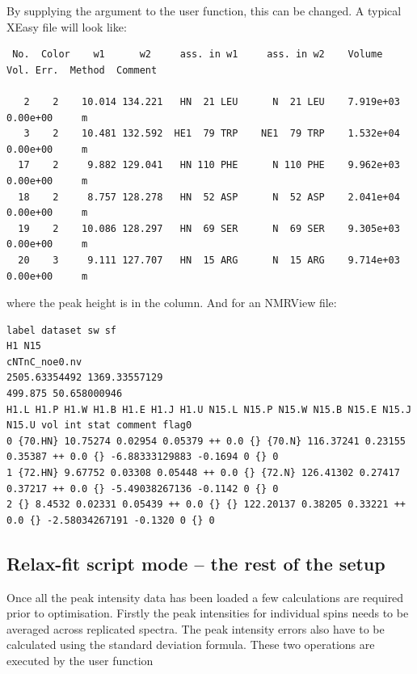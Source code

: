 By supplying the  argument to the  user function, this can be changed.
A typical XEasy file will look like:

{\scriptsize \begin{verbatim}
 No.  Color    w1      w2     ass. in w1     ass. in w2    Volume     Vol. Err.  Method  Comment

   2    2    10.014 134.221   HN  21 LEU      N  21 LEU    7.919e+03  0.00e+00     m
   3    2    10.481 132.592  HE1  79 TRP    NE1  79 TRP    1.532e+04  0.00e+00     m
  17    2     9.882 129.041   HN 110 PHE      N 110 PHE    9.962e+03  0.00e+00     m
  18    2     8.757 128.278   HN  52 ASP      N  52 ASP    2.041e+04  0.00e+00     m
  19    2    10.086 128.297   HN  69 SER      N  69 SER    9.305e+03  0.00e+00     m
  20    3     9.111 127.707   HN  15 ARG      N  15 ARG    9.714e+03  0.00e+00     m
\end{verbatim}}

where the peak height is in the  column.
And for an NMRView file:

{\tiny \begin{verbatim}
label dataset sw sf
H1 N15
cNTnC_noe0.nv
2505.63354492 1369.33557129
499.875 50.658000946
H1.L H1.P H1.W H1.B H1.E H1.J H1.U N15.L N15.P N15.W N15.B N15.E N15.J N15.U vol int stat comment flag0
0 {70.HN} 10.75274 0.02954 0.05379 ++ 0.0 {} {70.N} 116.37241 0.23155 0.35387 ++ 0.0 {} -6.88333129883 -0.1694 0 {} 0
1 {72.HN} 9.67752 0.03308 0.05448 ++ 0.0 {} {72.N} 126.41302 0.27417 0.37217 ++ 0.0 {} -5.49038267136 -0.1142 0 {} 0
2 {} 8.4532 0.02331 0.05439 ++ 0.0 {} {} 122.20137 0.38205 0.33221 ++ 0.0 {} -2.58034267191 -0.1320 0 {} 0
\end{verbatim}}



\subsection{Relax-fit script mode -- the rest of the setup} \label{sect: Rx setup fin}

Once all the peak intensity data has been loaded a few calculations are required prior to optimisation.
Firstly the peak intensities for individual spins needs to be averaged across replicated spectra.
The peak intensity errors also have to be calculated using the standard deviation formula.
These two operations are executed by the user function


